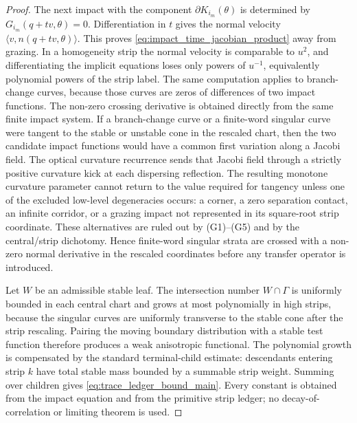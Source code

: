 \documentclass[12pt, letterpaper]{amsart}
\theoremstyle{plain}
\theoremstyle{definition}
\theoremstyle{remark}
\begin{document}
\begin{proof}
The next impact with the component \(\partial K_{i_m}(\theta)\) is determined
by \(G_{i_m}(q+t v,\theta)=0\).  Differentiation in \(t\) gives the normal
velocity \(\langle v,n(q+t v,\theta)\rangle\).  This proves
\eqref{eq:impact_time_jacobian_product} away from grazing.  In a homogeneity
strip the normal velocity is comparable to \(u^2\), and differentiating the
implicit equations loses only powers of \(u^{-1}\), equivalently polynomial
powers of the strip label.  The same computation applies to branch-change
curves, because those curves are zeros of differences of two impact functions.
The non-zero crossing derivative is obtained directly from the same finite
impact system.  If a branch-change curve or a finite-word singular curve were
tangent to the stable or unstable cone in the rescaled chart, then the two
candidate impact functions would have a common first variation along a Jacobi
field.  The optical curvature recurrence sends that Jacobi field through a
strictly positive curvature kick at each dispersing reflection.  The resulting
monotone curvature parameter cannot return to the value required for tangency
unless one of the excluded low-level degeneracies occurs: a corner, a zero
separation contact, an infinite corridor, or a grazing impact not represented in
its square-root strip coordinate.  These alternatives are ruled out by
\textup{(G1)--(G5)} and by the central/strip dichotomy.  Hence finite-word
singular strata are crossed with a non-zero normal derivative in the rescaled
coordinates before any transfer operator is introduced.

Let \(W\) be an admissible stable leaf.  The intersection number
\(W\cap\Gamma\) is uniformly bounded in each central chart and grows at most
polynomially in high strips, because the singular curves are uniformly
transverse to the stable cone after the strip rescaling.  Pairing the moving
boundary distribution with a stable test function therefore produces a weak
anisotropic functional.  The polynomial growth is compensated by the standard
terminal-child estimate: descendants entering strip \(k\) have total stable
mass bounded by a summable strip weight.  Summing over children gives
\eqref{eq:trace_ledger_bound_main}.  Every constant is obtained from the
impact equation and from the primitive strip ledger; no decay-of-correlation or
limiting theorem is used.
\end{proof}
\end{document}
